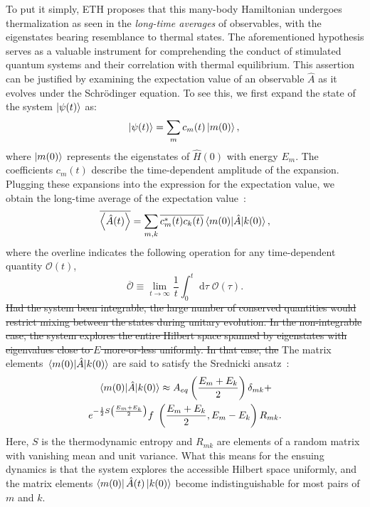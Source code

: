\documentclass[%
reprint,
superscriptaddress,
linenumbers,
amsmath,amssymb,
aps,
prb,
showkeys,
]{revtex4-2}
\begin{document}
To put it simply, ETH proposes that this many-body Hamiltonian undergoes thermalization as seen in the \textit{long-time averages} of observables, with the eigenstates bearing resemblance to thermal states. The aforementioned hypothesis serves as a valuable instrument for comprehending the conduct of stimulated quantum systems and their correlation with thermal equilibrium. This assertion can be justified by examining the expectation value of an observable $\hat{A}$ as it evolves under the Schr\"odinger equation. To see this, we first expand the state of the system $\ket{\psi(t)}$ as:
\begin{equation*}
\ket{\psi(t)} =  \sum_m c_m(t)\ket{m(0)},\\ 
\end{equation*}
where $\ket{m(0)}$ represents the eigenstates of $\hat{H}(0)$ with energy $E_m$. The coefficients $c_m (t)$ describe the time-dependent amplitude of the expansion.
Plugging these expansions into the expression for the expectation value, we obtain the long-time average of the expectation value~\cite{abanin_colloquium_2019}:
\begin{equation}
	\overline{\expval{\hat{A}(t)}} 
	= \sum_{m,k} \overline{c_m^\ast(t) c_k(t)}
	\mel{m(0)}{\hat{A}}{k(0)},
\end{equation}
where the overline indicates the following operation for any time-dependent quantity $\mathcal{O}(t)$, 
\begin{equation}
	\overline{{\mathcal{O}}} \equiv \lim_{t\rightarrow\infty}\frac{1}{t}\int^t_0\;\mathrm{d}\tau\; {\mathcal{O}(\tau)} .
	\label{eq:lt_avg}
\end{equation}
\st{Had the system been integrable, the large number of conserved quantities would restrict mixing between the states during unitary evolution. In the non-integrable case,
the system explores the entire Hilbert space spanned by eigenstates with eigenvalues close to $E$ more-or-less uniformly. In that case, the} The matrix elements $\mel{m(0)}{\hat{A}}{k(0)}$ are said to satisfy the Srednicki ansatz~\cite{Srednicki1994,Srednicki_1999}:
\begin{multline}
	\mel{m(0)}{\hat{A}}{k(0)} \approx A_{eq}\left(\frac{E_m+E_k}{2}\right) \delta_{mk} +\\ e^{-\frac12 S\left(\frac{E_m+E_k}{2}\right)} f\;\left(\frac{E_m+E_k}{2}, E_m-E_k\right)R_{mk}.
\end{multline}
Here, $S$ is the thermodynamic entropy and $R_{mk}$ are elements of a random matrix with vanishing mean and unit variance. What this means for the ensuing dynamics is that the system explores the accessible Hilbert space uniformly,  and the matrix elements $\bra{m(0)}\hat{A}(t)\ket{k(0)}$ become indistinguishable for most pairs of $m$ and $k$.
\end{document}
